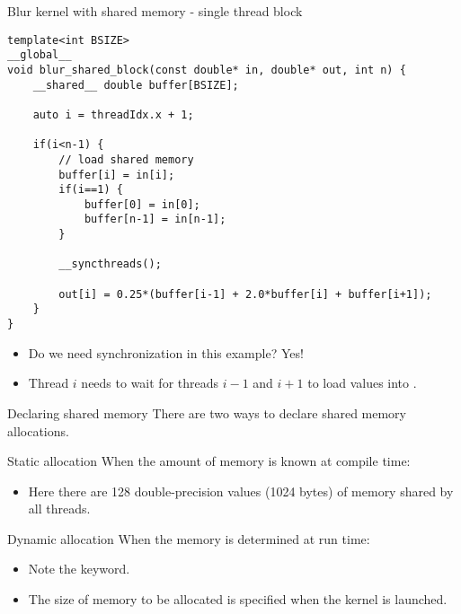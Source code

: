\documentclass[aspectratio=43]{beamer}
\begin{document}
\begin{frame}[fragile]{}
    \begin{code}{Blur kernel with shared memory - single thread block}
        \begin{lstlisting}[style=boxcudatiny]
template<int BSIZE>
__global__
void blur_shared_block(const double* in, double* out, int n) {
    __shared__ double buffer[BSIZE];

    auto i = threadIdx.x + 1;

    if(i<n-1) {
        // load shared memory
        buffer[i] = in[i];
        if(i==1) {
            buffer[0] = in[0];
            buffer[n-1] = in[n-1];
        }

        __syncthreads();

        out[i] = 0.25*(buffer[i-1] + 2.0*buffer[i] + buffer[i+1]);
    }
}
        \end{lstlisting}
    \end{code}
    \begin{itemize}
        \item Do we need synchronization in this example? Yes!
        \item Thread $i$ needs to wait for threads $i-1$ and $i+1$ to load values into .
    \end{itemize}

\end{frame}

\begin{frame}[fragile]{Declaring shared memory}
    There are two ways to declare shared memory allocations.

    \begin{info}{Static allocation}
        When the amount of memory is known at compile time:

        \centering {}
        \begin{itemize}
            \item Here there are 128 double-precision values (1024 bytes) of memory shared by all threads.
        \end{itemize}
    \end{info}

    \begin{info}{Dynamic allocation}
        When the memory is determined at run time:

        \centering {}
        \begin{itemize}
            \item Note the  keyword.
            \item The size of memory to be allocated is specified when the kernel is launched.
        \end{itemize}
    \end{info}

\end{frame}
\end{document}
